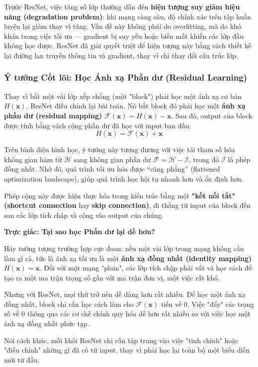 Trước ResNet, việc tăng số lớp thường dẫn đến \textbf{hiện tượng suy giảm hiệu năng (degradation problem)}: 
khi mạng càng sâu, độ chính xác trên tập huấn luyện lại giảm thay vì tăng. 
Vấn đề này không phải do overfitting, mà do khó khăn trong việc tối ưu — 
gradient bị suy yếu hoặc biến mất khiến các lớp đầu không học được. 
ResNet đã giải quyết triệt để hiện tượng này bằng cách thiết kế lại đường lan truyền thông tin 
và gradient, thay vì chỉ thay đổi cấu trúc lớp.

\subsubsection{Ý tưởng Cốt lõi: Học Ánh xạ Phần dư (Residual Learning)}
\label{subsubsec:resnet_residual_learning}
Thay vì bắt một vài lớp xếp chồng (một "block") phải học một ánh xạ cơ bản $H(\mathbf{x})$, ResNet điều chỉnh lại bài toán. Nó bắt block đó phải học một \textbf{ánh xạ phần dư (residual mapping)} $\mathcal{F}(\mathbf{x}) = H(\mathbf{x}) - \mathbf{x}$. Sau đó, output của block được tính bằng cách cộng phần dư đã học với input ban đầu:
\begin{equation}
	H(\mathbf{x}) = \mathcal{F}(\mathbf{x}) + \mathbf{x}
\end{equation}

Trên bình diện hình học, ý tưởng này tương đương với việc 
tái tham số hóa không gian hàm từ $\mathcal{H}$ sang không gian phần dư $\mathcal{F} = \mathcal{H} - \mathcal{I}$, 
trong đó $\mathcal{I}$ là phép đồng nhất. 
Nhờ đó, quá trình tối ưu hóa được “căng phẳng” (flattened optimization landscape), 
giúp quá trình học hội tụ nhanh hơn và ổn định hơn.

Phép cộng này được hiện thực hóa trong kiến trúc bằng một \textbf{"kết nối tắt" (shortcut connection} hay \textbf{skip connection)}, đi thẳng từ input của block đến sau các lớp tích chập và cộng vào output của chúng.

\begin{mdframed}[style=infobox]
	\textbf{Trực giác: Tại sao học Phần dư lại dễ hơn?}
	
	Hãy tưởng tượng trường hợp cực đoan: nếu một vài lớp trong mạng không cần làm gì cả, tức là ánh xạ tối ưu là một \textbf{ánh xạ đồng nhất (identity mapping)} $H(\mathbf{x}) = \mathbf{x}$. Đối với một mạng "plain", các lớp tích chập phải vất vả học cách để tạo ra một ma trận trọng số gần với ma trận đơn vị, một việc rất khó.
	
	Nhưng với ResNet, mọi thứ trở nên dễ dàng hơn rất nhiều. Để học một ánh xạ đồng nhất, block chỉ cần học cách làm cho $\mathcal{F}(\mathbf{x})$ tiến về 0. Việc "đẩy" các trọng số về 0 thông qua các cơ chế chính quy hóa dễ hơn rất nhiều so với việc học một ánh xạ đồng nhất phức tạp.
	
	Nói cách khác, mỗi khối ResNet chỉ cần tập trung vào việc "tinh chỉnh" hoặc "điều chỉnh" những gì đã có từ input, thay vì phải học lại toàn bộ một biểu diễn mới từ đầu.
\end{mdframed}

